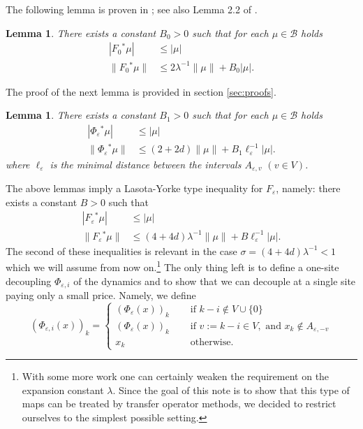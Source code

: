 \documentclass{amsart}
\numberwithin{equation}{section}
\newtheorem{lem}[thm]{Lemma}
\begin{document}
The following lemma is proven in \cite[Proposition 4]{kl-lecture}; see also
Lemma 2.2 of \cite{kl-cmp}.  
\begin{lem}\label{lem:indip}
There exists a constant $B_0>0$ such that for each $\mu\in{{\mathcal B}}$ holds
\[
\begin{split}
|F_0{^*}\mu|&\leq |\mu|\\
\|F_0{^*}\mu\|&\leq  2\lambda^{-1}\|\mu\|+B_0|\mu|.
\end{split}
\]
\end{lem}
The proof of the next lemma is provided in section \ref{sec:proofs}.
\begin{lem} \label{lem:couple}
There exists a constant $B_1>0$ such that for each $\mu\in{{\mathcal B}}$ holds
\[
\begin{split}
|\Phi_{\varepsilon}{^*}\mu|&\leq |\mu|\\
\|\Phi_{\varepsilon}{^*}\mu\|&\leq  (2+2d)\|\mu\|+B_1\ell_{\varepsilon}^{-1}|\mu|.
\end{split}
\]
where $\ell_{\varepsilon}$ is the minimal distance between the intervals $A_{{\varepsilon},v}$
$(v\in V)$. 
\end{lem}
The above lemmas imply a Lasota-Yorke type inequality for $F_{\varepsilon}$, namely:
there exists a constant $B>0$ such that
\begin{equation}\label{eq:lasota-yorke}
\begin{split}
|F_{\varepsilon}{^*}\mu|&\leq |\mu|\\
\|F_{\varepsilon}{^*}\mu\|&\leq  (4+4d)\lambda^{-1}\|\mu\|+B\ell_{\varepsilon}^{-1}|\mu|.
\end{split}
\end{equation}  
The second of these inequalities is relevant in the case
$\sigma=(4+4d)\lambda^{-1}<1$ which we will assume from now on.\footnote{With
  some more work one can certainly 
    weaken the requirement on the expansion
  constant $\lambda$. Since the goal of this note is to show that this type of
  maps can be treated by transfer operator methods, we decided to restrict
  ourselves
 to the simplest possible setting.}  The only thing left is to
define a one-site decoupling $\Phi_{{\varepsilon},i}$ of the dynamics and to show that we
can decouple at a single site paying only a small price. Namely, we define
\begin{equation}\label{eq:decouple}
  (\Phi_{{\varepsilon},i}(x))_k
  =
  \begin{cases}
    (\Phi_{\varepsilon}(x))_k\quad &\text{ if }k-i\not\in V\cup\{0\}\\
    (\Phi_{\varepsilon}(x))_k &\text{ if }  
v:=k-i  
   \in V,\text{ and }x_k\not\in A_{{\varepsilon},-v}\\
    x_k &\text { otherwise.}
  \end{cases}    
\end{equation}
\end{document}

